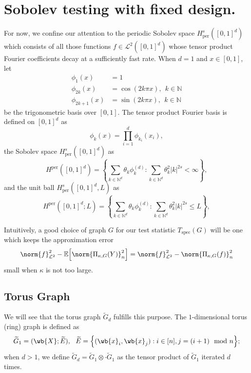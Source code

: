 \documentclass{article}
\newcommand{\abs}[1]{\left \lvert #1 \right \rvert}
\newcommand{\set}[1]{\left\{#1\right\}}
\newcommand{\1}{\mathbf{1}}
\newcommand{\Leb}{\mathcal{L}}
\newcommand{\Ebb}{\mathbb{E}}
\newcommand{\wt}[1]{\widetilde{#1}}
\newcommand{\spec}{\mathrm{spec}}
\theoremstyle{alden}
\theoremstyle{aldenthm}
\theoremstyle{definition}
\theoremstyle{remark}
\begin{document}
\section{Sobolev testing with fixed design.}
For now, we confine our attention to the periodic Sobolev space $H_{\textrm{per}}^{s}([0,1]^d)$ which consists of all those functions $f \in \Leb^2([0,1]^d)$ whose tensor product Fourier coefficients decay at a sufficiently fast rate. When $d = 1$ and $x \in [0,1]$, let
\begin{align*}
\phi_1(x) & = 1 \\
\phi_{2k}(x) & = \cos(2k\pi x),~~ k \in \mathbb{N} \\
\phi_{2k + 1}(x) & = \sin(2k\pi x),~~ k \in \mathbb{N}
\end{align*}
be the trigonometric basis over $[0,1]$. The tensor product Fourier basis is defined on $[0,1]^d$ as
\begin{equation*}
\phi_k(x) = \prod_{i = 1}^{d} \phi_{k_i}(x_i),
\end{equation*}
the Sobolev space $H_{\textrm{per}}^{s}([0,1]^d)$ as 
\begin{equation*}
H^{\textrm{per}}([0,1]^d) = \set{\sum_{k \in \mathbb{N}^d} \theta_k \phi_k^{(d)}: \sum_{k \in \mathbb{N}^d} \theta_k^2 \abs{k}^{2s} < \infty},
\end{equation*}
and the unit ball $H_{\textrm{per}}^{s}([0,1]^d, L)$ as 
\begin{equation*}
H^{\textrm{per}}([0,1]^d;L) = \set{\sum_{k \in \mathbb{N}^d} \theta_k \phi_k^{(d)}: \sum_{k \in \mathbb{N}^d} \theta_k^2 \abs{k}^{2s} \leq L},
\end{equation*}

Intuitively, a good choice of graph $G$ for our test statistic $T_{\spec}(G)$ will be one which keeps the approximation error
\begin{equation*}
\norm{f}_{\Leb^2}^2 - \Ebb\Bigl[\norm{\Pi_{\kappa,G}(Y)}_{n}^2\Bigr] =  \norm{f}_{\Leb^2}^2 - \norm{\Pi_{\kappa,G}(f)}_{n}^2
\end{equation*}
small when $\kappa$ is not too large.

\subsection{Torus Graph}

We will see that the torus graph $\wt{G}_d$ fulfills this purpose. The $1$-dimensional torus (ring) graph is defined as
\begin{equation*}
\wt{G}_1 = (\wb{X}; \wt{E}),~~ \wt{E} = \Bigl\{(\wb{x}_i,\wb{x}_j): i \in [n], j = (i + 1) \mod n\Bigr\};
\end{equation*}
when $d > 1$, we define $\wt{G}_d = \wt{G}_1 \otimes \cdot \wt{G}_1$ as the tensor product of $\wt{G}_1$ iterated $d$ times.
\end{document}
